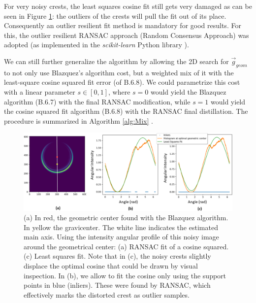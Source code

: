 \documentclass[11pt, a4paper, twoside]{article} %
\begin{document}
For very noisy crests, the least squares cosine fit still gets very damaged as can be seen in Figure \ref{fig:ransac}: the outliers of the crests will pull the fit out of its place. Consequently an outlier resilient fit method is mandatory for good results. For this, the outlier resilient RANSAC approach (Random Consensus Approach) \cite{RANSAC} was adopted (as implemented in the {\em scikit-learn} Python library \cite{sklearn}). \vspace{-0.05cm}


We can still further generalize the algorithm by allowing the 2D search for $\vec{g}_{geom}$ to not only use Blazquez's algorithm cost, but a weighted mix of it with the least-square cosine squared fit error (of B.6.8). We could parametrize this cost with a linear parameter $s\in[0,1]$, where $s=0$ would yield the Blazquez algorithm (B.6.7) with the final RANSAC modification, while $s=1$ would yield the cosine squared fit algorithm (B.6.8) with the RANSAC final distillation. The procedure is summarized in Algorithm \ref{alg:Mix} .

\begin{figure}[h!] 
     \centering 
    \includegraphics[width=0.8\linewidth]{histo.PNG}
    \caption{ (a) In red, the geometric center found with the Blazquez algorithm. In yellow the gravicenter. The white line indicates the estimated main axis. Using the intensity angular profile of this noisy image around the geometrical center: (a) RANSAC fit of a cosine squared. (c) Least squares fit. Note that in (c), the noisy crests slightly displace the optimal cosine that could be drawn by visual inspection. In (b), we allow to fit the cosine only using the support points in blue (inliers). These were found by RANSAC, which effectively marks the distorted crest as outlier samples.}
    \label{fig:ransac}
\end{figure}
\end{document}
